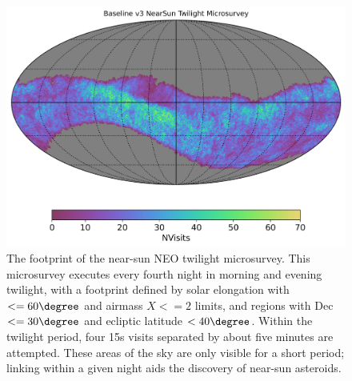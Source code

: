 \begin{figure}[t!]
    \centering
    \includegraphics[width=4.7in]{figures/v3TwilightMicrosurvey.png}
    \caption{The footprint of the near-sun NEO twilight microsurvey. This microsurvey executes every fourth night in morning and evening twilight, with a footprint defined by solar elongation with $<=60\degree$ and airmass $X<=2$ limits, and regions with Dec $<= 30\degree$ and ecliptic latitude $< 40\degree$. Within the twilight period, four 15s visits separated by about five minutes are attempted. These areas of the sky are only visible for a short period; linking within a given night aids the discovery of near-sun asteroids. }\label{fig:baselinev3Micro}
\end{figure}